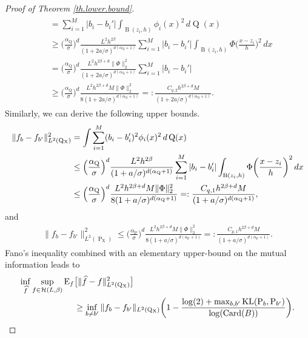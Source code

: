 \documentclass[10pt]{article}
\newcommand{\mH}{\mathcal{H}}
\newcommand{\B}{\operatorname{B}}
\newcommand{\E}{\operatorname{E}}
\renewcommand{\P}{\operatorname{P}}
\newcommand{\Q}{\operatorname{Q}}
\newcommand{\wh}{\widehat}
\newcommand{\card}{\operatorname{Card}}
\newcommand{\KL}{\operatorname{KL}}
\newcommand{\sX}{\mathrm{X}}
\begin{document}
\begin{proof}[Proof of Theorem \ref{th.lower.bound}]
\begin{align}
\begin{split}
        &= \sum_{i=1}^M|b_i - b_i'|\int_{\B(z_i, h)}\phi_i(x)^2\, d\Q(x)\\
        &\geq \Big(\frac{\alpha_{\Q}}{\sigma}\Big)^d\frac{L^2h^{2\beta}}{(1 + 2a/\sigma)^{d(\alpha_{\Q} + 1)}}\sum_{i=1}^M|b_i - b_i'|\int_{\B(z_i, h)}\Phi\bigg(\frac{x - z_i}{h}\bigg)^2\, dx\\
        &= \Big(\frac{\alpha_{\Q}}{\sigma}\Big)^d\frac{L^2h^{2\beta + d}\|\Phi\|_2^2}{(1 + 2a/\sigma)^{d(\alpha_{\Q} + 1)}}\sum_{i=1}^M|b_i - b_i'|\\
        &\geq \Big(\frac{\alpha_{\Q}}{\sigma}\Big)^d\frac{L^2h^{2\beta+d}M\|\Phi\|_{2}^2}{8(1 + 2a/\sigma)^{d(\alpha_{\Q} + 1)}} =: \frac{C_{q, 2}h^{2\beta + d}M}{(1 + 2a/\sigma)^{d(\alpha_{\Q} + 1)}}.
        \end{split}
    \end{align}
    Similarly, we can derive the following upper bounds.
    \begin{align*}
        \|f_{b} - f_{b'}\|^2_{L^2(\Q\mathstrut_{\!\sX})} &= \int \sum_{i=1}^M (b_i - b_i')^2\phi_i(x)^2\, d\Q(x)\\
        &\leq \Big(\frac{\alpha_{\Q}}{\sigma}\Big)^d\frac{L^2h^{2\beta}}{(1 + a/\sigma)^{d(\alpha_{\Q} + 1)}}\sum_{i=1}^M|b_i - b_i'|\int_{\B(z_i, h)}\Phi\bigg(\frac{x - z_i}{h}\bigg)^2\, dx\\
        &\leq \Big(\frac{\alpha_{\Q}}{\sigma}\Big)^d\frac{L^2h^{2\beta+d}M\|\Phi\|_{2}^2}{8(1 + a/\sigma)^{d(\alpha_{\Q} + 1)}} =: \frac{C_{q, 1}h^{2\beta + d}M}{(1 + a/\sigma)^{d(\alpha_{\Q} + 1)}},
    \end{align*}
    and 
    \begin{align*}
        \|f_{b} - f_{b'}\|^2_{L^2(\P_{\sX})} \leq \Big(\frac{\alpha_{\P}}{\sigma}\Big)^d\frac{L^2h^{2\beta+d}M\|\Phi\|_{2}^2}{8(1 + a/\sigma)^{d(\alpha_{\P} + 1)}} =: \frac{C_{p, 1}h^{2\beta + d}M}{(1 + a/\sigma)^{d(\alpha_{\P} + 1)}}.
    \end{align*}
    Fano's inequality \cite[Proposition 15.2]{wainwrighthighdimstat} combined with an elementary upper-bound on the mutual information leads to
    \begin{align}
        \label{eq.fano}
        \begin{split}
        \inf_{\wh f} \sup_{f \in \mH(L, \beta)}\E_{f}&\big[\|\wh f - f\|_{L^2(\Q\mathstrut_{\!\sX})}^2\big]\\
        &\geq \inf_{b\neq b'}\|f_b - f_{b'}\|_{L^2(\Q\mathstrut_{\!\sX})}\bigg(1 - \frac{\log(2) + \max_{b, b'}\KL(\P_b, \P_{b'})}{\log(\card(B))}\bigg).
        \end{split}

\end{align}
\end{proof}
\end{document}
